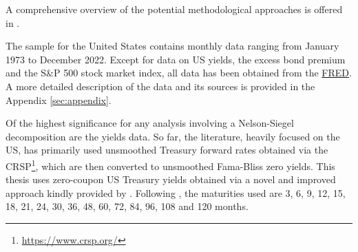 

A comprehensive overview of the potential methodological approaches is offered in \citet{diebold2013yield}. 

The sample for the United States contains monthly data ranging from January 1973 to December 2022. Except for data on US yields, the excess bond premium and the S\&P 500 stock market index, all data has been obtained from the \href{https://fred.stlouisfed.org/}{FRED}. A more detailed description of the data and its sources is provided in the Appendix \ref{sec:appendix}. 

Of the highest significance for any analysis involving a Nelson-Siegel decomposition are the yields data. So far, the literature, heavily focused on the US, has primarily used unsmoothed \citet{fama1987information} Treasury forward rates obtained via the CRSP\footnote{\url{https://www.crsp.org/}}, which are then converted to unsmoothed Fama-Bliss zero yields. This thesis uses zero-coupon US Treasury yields obtained via a novel and improved approach kindly provided by \citet{liu2021reconstructing}. Following \citet{diebold2006macroeconomy}, the maturities used are 3, 6, 9, 12, 15, 18, 21, 24, 30, 36, 48, 60, 72, 84, 96, 108 and 120 months. 

